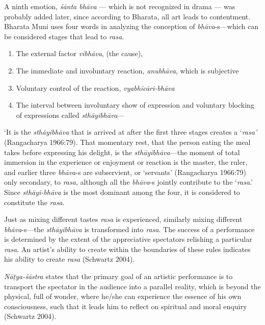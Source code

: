 A ninth emotion, \textsl{śānta bhāva} --- which is not recognized in drama --- was probably added later, since according to Bharata, all art leads to contentment. Bharata Muni uses four words in analyzing the conception of \textsl{bhāva}-s---which can be considered stages that lead to \textsl{rasa}. 
\begin{enumerate}
\itemsep=1pt
\item The external factor \textsl{vibhāva}, (the cause), 
\item The immediate and involuntary reaction, \textsl{anubhāva}, which is subjective
\item Voluntary control of the reaction, \textsl{vyabhicāri-bhāva}
\item The interval between involuntary show of expression and voluntary blocking of expressions called \textsl{sthāyibhāva}---
\end{enumerate}

‘It is the \textsl{sthāyibhāva} that is arrived at after the first three stages creates a ‘\textsl{rasa’} (Rangacharya 1966:79). That momentary rest, that the person eating the meal takes before expressing his delight, is the \textsl{sthāyibhāva}---the moment of total immersion in the experience or enjoyment or reaction is the master, the ruler, and earlier three \hbox{\textsl{bhāva}-s} are subservient, or ‘servants’ (Rangacharya 1966:79) only secondary, to \textsl{rasa}, although all the \textsl{bhāva}-s jointly contribute to the ‘\textsl{rasa}.’ Since \textsl{sthāyi-bhāva} is the most dominant among the four, it is considered to constitute the \textsl{rasa}.

Just as mixing different tastes \textsl{rasa} is experienced, similarly mixing different \textsl{bhāva}-s---the \textsl{sthāyibhāva} is transformed into \textsl{rasa}. The success of a performance is determined by the extent of the appreciative spectators relishing a particular \textsl{rasa}. An artist’s ability to create within the boundaries of these rules indicates his ability to create \textsl{rasa} (Schwartz 2004). 


\textsl{Nāṭya-śāstra} states that the primary goal of an artistic performance is to transport the spectator in the audience into a parallel reality, which is beyond the physical, full of wonder, where he/she can experience the essence of his own consciousness, such that it leads him to reflect on spiritual and moral enquiry (Schwartz 2004). 

